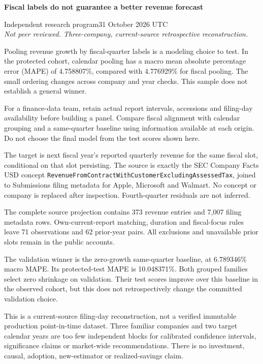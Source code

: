 \documentclass[11pt,letterpaper]{article}
\newcommand{\heading}[1]{\vspace{4pt}{\large\bfseries #1}\par}
\newcommand{\BoundA}{4.758807}
\newcommand{\BoundB}{4.776929}
\newcommand{\BoundC}{373}
\newcommand{\BoundD}{7,007}
\newcommand{\BoundE}{71}
\newcommand{\BoundF}{62}
\newcommand{\BoundG}{6.789346}
\newcommand{\BoundH}{10.048371}
\begin{document}
{\LARGE\bfseries Fiscal labels do not guarantee a better revenue forecast\par}
\vspace{5pt}Independent research program\hfill 31 October 2026 UTC\\
\textit{Not peer reviewed. Three-company, current-source retrospective reconstruction.}

\heading{Practical finding}
Pooling revenue growth by fiscal-quarter labels is a modeling choice to test. In the protected cohort, calendar pooling has a macro mean absolute percentage error (MAPE) of \BoundA{}\%, compared with \BoundB{}\% for fiscal pooling. The small ordering changes across company and year checks. This sample does not establish a general winner.

For a finance-data team, retain actual report intervals, accessions and filing-day availability before building a panel. Compare fiscal alignment with calendar grouping and a same-quarter baseline using information available at each origin. Do not choose the final model from the test scores shown here.

\heading{What was measured}
The target is next fiscal year's reported quarterly revenue for the same fiscal slot, conditional on that slot persisting. The source is exactly the SEC Company Facts USD concept \texttt{RevenueFromContract\allowbreak{}WithCustomer\allowbreak{}ExcludingAssessedTax}, joined to Submissions filing metadata for Apple, Microsoft and Walmart. No concept or company is replaced after inspection. Fourth-quarter residuals are not inferred.

The complete source projection contains \BoundC{} revenue entries and \BoundD{} filing metadata rows. Own-current-report matching, duration and fiscal-focus rules leave \BoundE{} observations and \BoundF{} prior-year pairs. All exclusions and unavailable prior slots remain in the public accounts.

\heading{A result that depends on the evaluation period}
The validation winner is the zero-growth same-quarter baseline, at \BoundG{}\% macro MAPE. Its protected-test MAPE is \BoundH{}\%. Both grouped families select zero shrinkage on validation. Their test scores improve over this baseline in the observed cohort, but this does not retrospectively change the committed validation choice.

\heading{Material limits}
This is a current-source filing-day reconstruction, not a verified immutable production point-in-time dataset. Three familiar companies and two target calendar years are too few independent blocks for calibrated confidence intervals, significance claims or market-wide recommendations. There is no investment, causal, adoption, new-estimator or realized-savings claim.
\end{document}
